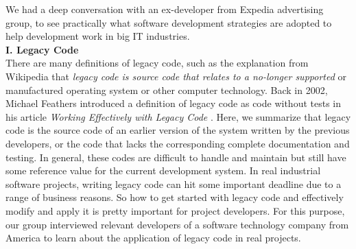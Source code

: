 \documentclass[11pt]{article}
\begin{document}
We had a deep conversation with an ex-developer from Expedia advertising group, to see practically what software development strategies are adopted to help development work in big IT industries. \\[10px]
{\bf I. Legacy Code}\\[10px]
There are many definitions of legacy code, such as the explanation from Wikipedia that \textit{legacy code is source code that relates to a no-longer supported} \cite{no1} or manufactured operating system or other computer technology. Back in 2002, Michael Feathers introduced a definition of legacy code as code without tests in his article \textit{Working Effectively with Legacy Code} \cite{no2}. Here, we summarize that legacy code is the source code of an earlier version of the system written by the previous developers, or the code that lacks the corresponding complete documentation and testing. In general, these codes are difficult to handle and maintain but still have some reference value for the current development system. In real industrial software projects, writing legacy code can hit some important deadline due to a range of business reasons. So how to get started with legacy code and effectively modify and apply it is pretty important for project developers. For this purpose, our group interviewed relevant developers of a software technology company from America to learn about the application of legacy code in real projects. \\[10px]
\end{document}
